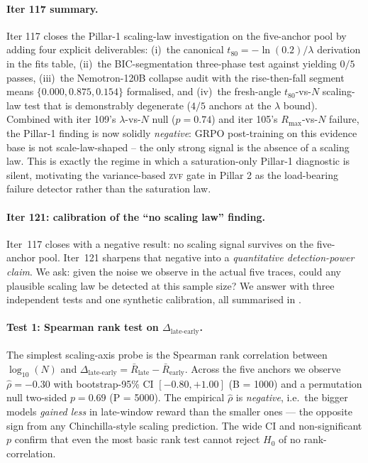 \paragraph{Iter 117 summary.}
\label{par:scaling-iter117-summary}
Iter 117 closes the Pillar-1 scaling-law investigation on the
five-anchor pool by adding four explicit deliverables: (i)~the
canonical $t_{80}=-\ln(0.2)/\lambda$ derivation in the fits table,
(ii)~the BIC-segmentation three-phase test against
\citet{nimmaturi2025predictive} yielding $0/5$
passes, (iii)~the Nemotron-120B collapse audit with the rise-then-fall
segment means $\{0.000, 0.875, 0.154\}$ formalised, and (iv)~the
fresh-angle $t_{80}$-vs-$N$ scaling-law test that is demonstrably
degenerate ($4/5$ anchors at the $\lambda$ bound).  Combined with
iter 109's $\lambda$-vs-$N$ null ($p = 0.74$) and iter 105's
$R_{\max}$-vs-$N$ failure, the Pillar-1 finding is now solidly
\emph{negative}: GRPO post-training on this evidence base is not
scale-law-shaped -- the only strong signal is the absence of a
scaling law.  This is exactly the regime in which a
saturation-only Pillar-1 diagnostic is silent, motivating the
variance-based \textsc{zvf} gate in Pillar 2 as the load-bearing
failure detector rather than the saturation law.

\paragraph{Iter 121: calibration of the ``no scaling law'' finding.}
\label{par:scaling-iter121}
Iter~117 closes with a negative result: no scaling signal survives
on the five-anchor pool.  Iter~121 sharpens that negative into a
\emph{quantitative detection-power claim}.  We ask: given the noise
we observe in the actual five traces, could any plausible scaling
law be detected at this sample size?  We answer with three
independent tests and one synthetic calibration, all summarised in
.

\paragraph{Test 1: Spearman rank test on $\Delta_{\text{late-early}}$.}
\label{par:scaling-iter121-le}
The simplest scaling-axis probe is the Spearman rank correlation
between $\log_{10}(N)$ and $\Delta_{\text{late-early}}
= \bar R_{\text{late}} - \bar R_{\text{early}}$.  Across the five
anchors we observe $\hat\rho = -0.30$ with bootstrap-95\% CI
$[-0.80, +1.00]$ (B = 1000) and a permutation null two-sided
$p = 0.69$ (P = 5000).  The empirical $\hat\rho$ is \emph{negative},
i.e.\ the bigger models \emph{gained less} in late-window reward
than the smaller ones --- the opposite sign from any Chinchilla-style
scaling prediction.  The wide CI and non-significant $p$ confirm
that even the most basic rank test cannot reject $H_0$ of no
rank-correlation.

